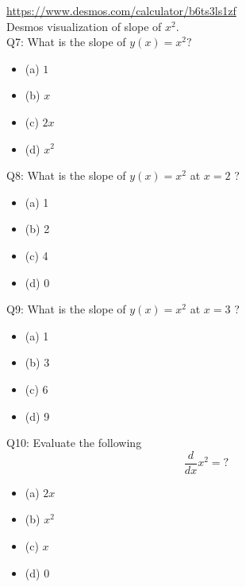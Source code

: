 \documentclass{article}
\begin{document}
\url{https://www.desmos.com/calculator/b6ts3ls1zf} \\
Desmos visualization of slope of $x^2$. \\[10pt]
Q7: What is the slope of $y(x)=x^2 ?$ 
\begin{itemize}
\item[] (a) $1$
\item[] (b) $x$
\item[] (c) $2 x$
\item[] (d) $x^2$
\end{itemize}
Q8: What is the slope of $y(x)=x^2$ at $x=2$ ?
\begin{itemize}
\item[] (a) 1
\item[] (b) 2
\item[] (c) 4
\item[] (d) 0
\end{itemize}
Q9: What is the slope of $y(x)=x^2$ at $x=3$ ?
\begin{itemize}
\item[] (a) 1
\item[] (b) 3
\item[] (c) 6
\item[] (d) 9
\end{itemize}
Q10: Evaluate the following
$$
\frac{d}{d x} x^2=?
$$
\begin{itemize}
\item[] (a) $2 x$
\item[] (b) $x^2$
\item[] (c) $x$
\item[] (d) $0$
\end{itemize}
\end{document}
